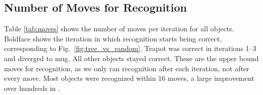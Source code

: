 \documentclass[letterpaper, 10 pt, conference]{ieeeconf}  %
\begin{document}





\subsection{Number of Moves for Recognition}


Table \ref{tab:moves} shows the number of moves per iteration for all objects. Boldface shows the iteration in which recognition starts being correct, corresponding to Fig.~\ref{fig:tree_vs_random}. Teapot was correct in iterations 1--3 and diverged to mug. All other objects stayed correct.
%
These are the upper bound moves for recognition, as we only ran recognition after each iteration, not after every move. Most objects were recognized within 16 moves, a large improvement over hundreds in \cite{triangles}.
\end{document}
